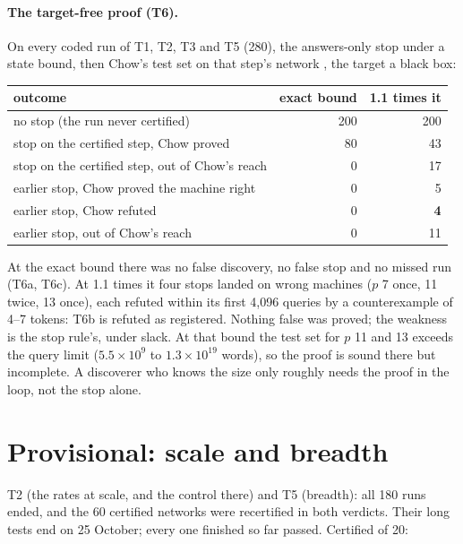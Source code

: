 \documentclass[11pt]{article}
\begin{document}
\paragraph{The target-free proof (T6).} On every coded run of T1, T2, T3 and T5 (280), the
answers-only stop under a state bound, then Chow's test set on that step's network
\citep{chow-1978-testing-software-design-finite-state-machines}, the target a black box:

\begin{center}
\begin{tabular}{lrr}
\toprule
outcome & exact bound & 1.1 times it \\
\midrule
no stop (the run never certified) & 200 & 200 \\
stop on the certified step, Chow proved & 80 & 43 \\
stop on the certified step, out of Chow's reach & 0 & 17 \\
earlier stop, Chow proved the machine right & 0 & 5 \\
earlier stop, Chow refuted & 0 & \textbf{4} \\
earlier stop, out of Chow's reach & 0 & 11 \\
\bottomrule
\end{tabular}
\end{center}

At the exact bound there was no false discovery, no false stop and no missed run (T6a, T6c). At
1.1 times it four stops landed on wrong machines ($p$ 7 once, 11 twice, 13 once), each refuted within
its first 4{,}096 queries by a counterexample of 4--7 tokens: T6b is refuted as registered. Nothing
false was proved; the weakness is the stop rule's, under slack. At that bound the test set for $p$
11 and 13 exceeds the query limit ($5.5\times10^{9}$ to $1.3\times10^{19}$ words), so the proof is
sound there but incomplete. A discoverer who knows the size only roughly needs the proof in the
loop, not the stop alone.

\section{Provisional: scale and breadth}

T2 (the rates at scale, and the control there) and T5 (breadth): all 180 runs ended, and the 60
certified networks were recertified in both verdicts. Their long tests end on 25 October; every one
finished so far passed. Certified of 20:
\end{document}

